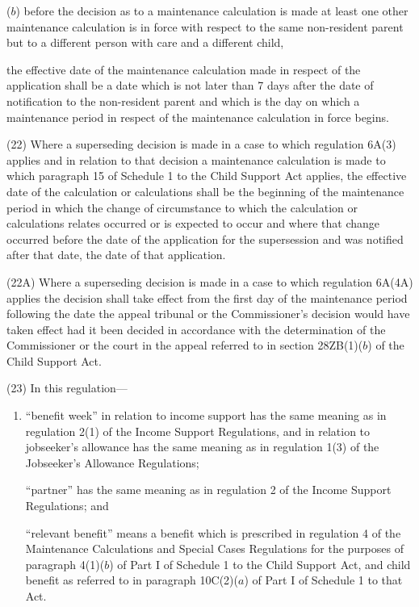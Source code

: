 \documentclass[12pt,a4paper]{article}
\begin{document}
{\begin{enumerate}
($b$) before the decision as to a maintenance calculation is made at least one other maintenance calculation is in force with respect to the same non-resident parent but to a different person with care and a different child,
\end{enumerate}
the effective date of the maintenance calculation made in respect of the application shall be a date which is not later than 7 days after the date of notification to the non-resident parent and which is the day on which a maintenance period in respect of the maintenance calculation in force begins.

(22) Where a superseding decision is made in a case to which regulation 6A(3) applies and in relation to that decision a maintenance calculation is made to which paragraph 15 of Schedule 1 to the Child Support Act applies, the effective date of the calculation or calculations shall be the beginning of the maintenance period in which the change of circumstance to which the calculation or calculations relates occurred or is expected to occur and where that change occurred before the date of the application for the supersession and was notified after that date, the date of that application.

(22A) Where a superseding decision is made in a case to which regulation 6A(4A) applies the decision shall take effect from the first day of the maintenance period following the date the appeal tribunal or the Commissioner’s decision would have taken effect had it been decided in accordance with the determination of the Commissioner or the court in the appeal referred to in section 28ZB(1)($b$)  of the Child Support Act.

(23) In this regulation—
\begin{enumerate}\item[]
    “benefit week” in relation to income support has the same meaning as in regulation 2(1) of the Income Support Regulations, and in relation to jobseeker’s allowance has the same meaning as in regulation 1(3) of the Jobseeker’s Allowance Regulations;

    “partner” has the same meaning as in regulation 2 of the Income Support Regulations; and

    “relevant benefit” means a benefit which is prescribed in regulation 4 of the Maintenance Calculations and Special Cases Regulations for the purposes of paragraph 4(1)($b$)  of Part I of Schedule 1 to the Child Support Act, and child benefit as referred to in paragraph 10C(2)($a$)  of Part I of Schedule 1 to that Act. 
\end{enumerate}

}
\end{document}
